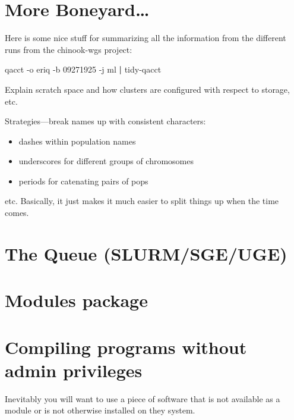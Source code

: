 \documentclass[]{krantz}
\makeatletter
\newenvironment{Shaded}{\begin{snugshade}}{\end{snugshade}}
\newcommand{\ExtensionTok}[1]{#1}
\newcommand{\KeywordTok}[1]{\textcolor[rgb]{0.27,0.27,0.27}{\textbf{#1}}}
\newcommand{\NormalTok}[1]{#1}
\providecommand{\tightlist}{%
  \setlength{\itemsep}{0pt}\setlength{\parskip}{0pt}}
\newenvironment{kframe}{%
\medskip{}
\setlength{\fboxsep}{.8em}
 \def\at@end@of@kframe{}%
 \ifinner\ifhmode%
  \def\at@end@of@kframe{\end{minipage}}%
  \begin{minipage}{\columnwidth}%
 \fi\fi%
 \def\FrameCommand##1{\hskip\@totalleftmargin \hskip-\fboxsep
 \colorbox{shadecolor}{##1}\hskip-\fboxsep
     \hskip-\linewidth \hskip-\@totalleftmargin \hskip\columnwidth}%
 \MakeFramed {\advance\hsize-\width
   \@totalleftmargin\z@ \linewidth\hsize
   \@setminipage}}%
 {\par\unskip\endMakeFramed%
 \at@end@of@kframe}
\renewenvironment{Shaded}{\begin{kframe}}{\end{kframe}}
\makeatother
\begin{document}
\hypertarget{more-boneyard}{%
\section{More Boneyard\ldots{}}\label{more-boneyard}}

Here is some nice stuff for summarizing all the information from the different runs from the chinook-wgs project:

\begin{Shaded}
\begin{Highlighting}[]
\ExtensionTok{qacct}\NormalTok{ -o eriq -b 09271925 -j ml }\KeywordTok{|} \ExtensionTok{tidy-qacct}
\end{Highlighting}
\end{Shaded}

Explain scratch space and how clusters are configured with respect to storage, etc.

Strategies---break names up with consistent characters:

\begin{itemize}
\tightlist
\item
  dashes within population names
\item
  underscores for different groups of chromosomes
\item
  periods for catenating pairs of pops
\end{itemize}

etc. Basically, it just makes it much easier to split things up
when the time comes.

\hypertarget{the-queue-slurmsgeuge}{%
\section{The Queue (SLURM/SGE/UGE)}\label{the-queue-slurmsgeuge}}

\hypertarget{modules-package}{%
\section{Modules package}\label{modules-package}}

\hypertarget{compiling-programs-without-admin-privileges}{%
\section{Compiling programs without admin privileges}\label{compiling-programs-without-admin-privileges}}

Inevitably you will want to use a piece of software that is not available as
a module or is not otherwise installed on they system.
\end{document}
